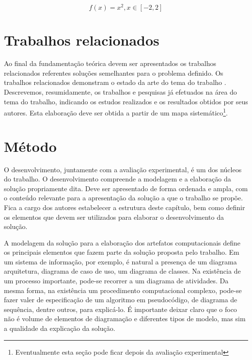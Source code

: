 \documentclass[12pt]{article}
\begin{document}
\begin{equation}
\label{eq_exemplo}
 f(x) = x^2, x \in [-2,2]
\end{equation}


	
	
	\section{Trabalhos relacionados}
	\label{sec_trab_relacionados}
	
	Ao final da fundamentação teórica devem ser apresentados os trabalhos relacionados referentes soluções semelhantes para o problema definido. Os trabalhos relacionados demonstram o estado da arte do tema do trabalho \citep{wazlawick_metodologia_2017}. Descrevemos, resumidamente, os trabalhos e pesquisas já efetuados na área do tema do trabalho, indicando os estudos realizados e os resultados obtidos por seus autores. Esta elaboração deve ser obtida a partir de um mapa sistemático\footnote{Eventualmente esta seção pode ficar depois da avaliação experimental}. 
	
	\section{Método}
	\label{sec_metodo}
	
	O desenvolvimento, juntamente com a avaliação experimental, é um dos núcleos do trabalho. O desenvolvimento compreende a modelagem e a elaboração da solução propriamente dita. Deve ser apresentado de forma ordenada e ampla, com o conteúdo relevante para a apresentação da solução a que o trabalho se propõe. Fica a cargo dos autores estabelecer a estrutura deste capítulo, bem como definir os elementos que devem ser utilizados para elaborar o desenvolvimento da solução. 
	
	A modelagem da solução para a elaboração dos artefatos computacionais define os principais elementos que fazem parte da solução proposta pelo trabalho. Em um sistema de informação, por exemplo, é natural a presença de um diagrama arquitetura, diagrama de caso de uso, um diagrama de classes. Na existência de um processo importante, pode-se recorrer a um diagrama de atividades. Da mesma forma, na existência um procedimento computacional complexo, pode-se fazer valer de especificação de um algoritmo em pseudocódigo, de diagrama de sequência, dentre outros, para explicá-lo. É importante deixar claro que o foco não é volume de elementos de diagramação e diferentes tipos de modelo, mas sim a qualidade da explicação da solução.
	
\end{document}

